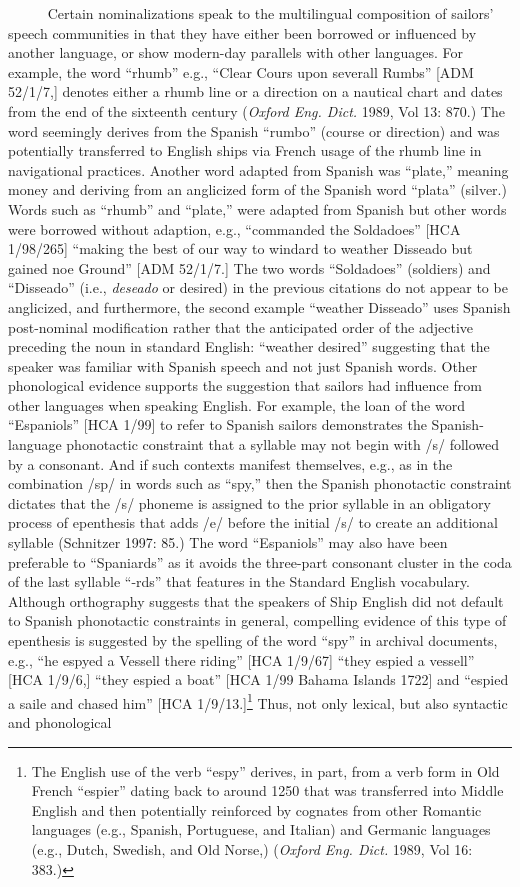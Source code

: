 \documentclass[12pt]{article}
\newenvironment{styleStandard}{\renewcommand\baselinestretch{1.0}\setlength\leftskip{0cm}\setlength\rightskip{0cm plus 1fil}\setlength\parindent{0cm}\setlength\parfillskip{0pt plus 1fil}\setlength\parskip{0in plus 1pt}\writerlistparindent\writerlistleftskip\leavevmode\normalfont\normalsize\writerlistlabel\ignorespaces}{\unskip\vspace{0in plus 1pt}\par}
\newcommand\writerlistleftskip{}
\newcommand\writerlistparindent{}
\newcommand\writerlistlabel{}
\begin{document}
\begin{styleStandard}
~~~ \ \ Certain nominalizations speak to the multilingual composition of sailors’ speech communities in that they have either been borrowed or influenced by another language, or show modern-day parallels with other languages. For example, the word “rhumb” e.g., “Clear Cours upon severall Rumbs” [ADM 52/1/7,] denotes either a rhumb line or a direction on a nautical chart and dates from the end of the sixteenth century (\textit{Oxford Eng. Dict. }1989, Vol 13: 870.) The word seemingly derives from the Spanish “rumbo” (course or direction) and was potentially transferred to English ships via French usage of the rhumb line in navigational practices. Another word adapted from Spanish was “plate,” meaning money and deriving from an anglicized form of the Spanish word “plata” (silver.) Words such as “rhumb” and “plate,” were adapted from Spanish but other words were borrowed without adaption, e.g., “commanded the\textit{ }Soldadoes” [HCA 1/98/265] “making the best of our way to windard to weather Disseado but gained noe Ground” [ADM 52/1/7.] The two words “Soldadoes” (soldiers) and “Disseado” (i.e., \textit{deseado} or desired) in the previous citations do not appear to be anglicized, and furthermore, the second example “weather Disseado” uses Spanish post-nominal modification rather that the anticipated order of the adjective preceding the noun in standard English: “weather desired” suggesting that the speaker was familiar with Spanish speech and not just Spanish words. Other phonological evidence supports the suggestion that sailors had influence from other languages when speaking English. For example, the loan of the word “Espaniols” [HCA 1/99] to refer to Spanish sailors demonstrates the Spanish-language phonotactic constraint that a syllable may not begin with /s/ followed by a consonant. And if such contexts manifest themselves, e.g., as in the combination /sp/ in words such as “spy,” then the Spanish phonotactic constraint dictates that the /s/ phoneme is assigned to the prior syllable in an obligatory process of epenthesis that adds /e/ before the initial /s/ to create an additional syllable (Schnitzer 1997: 85.) The word “Espaniols” may also have been preferable to “Spaniards” as it avoids the three-part consonant cluster in the coda of the last syllable “-rds” that features in the Standard English vocabulary. Although orthography suggests that the speakers of Ship English did not default to Spanish phonotactic constraints in general, compelling evidence of this type of epenthesis is suggested by the spelling of the word “spy” in archival documents, e.g., “he espyed a Vessell there riding” [HCA 1/9/67] “they espied a vessell” [HCA 1/9/6,] “they espied a boat” [HCA 1/99 Bahama Islands 1722] and “espied a saile and chased him” [HCA 1/9/13.]\footnote{ The English use of the verb “espy” derives, in part, from a verb form in Old French “espier” dating back to around 1250 that was transferred into Middle English and then potentially reinforced by cognates from other Romantic languages (e.g., Spanish, Portuguese, and Italian) and Germanic languages (e.g., Dutch, Swedish, and Old Norse,) (\textit{Oxford Eng. Dict. }1989, Vol 16: 383.)} Thus, not only lexical, but also syntactic and phonological 
\end{styleStandard}
\end{document}
